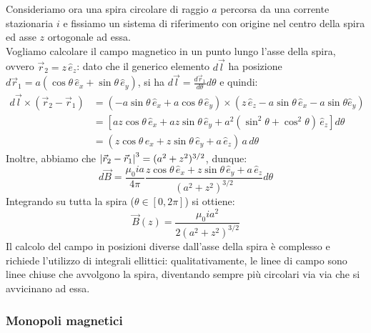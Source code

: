 \documentclass[]{article}
\begin{document}
Consideriamo ora una spira circolare di raggio $ a $ percorsa da una corrente stazionaria $ i $ e fissiamo un sistema di riferimento con origine nel centro della spira ed asse $ z $ ortogonale ad essa. \\ 
%
Vogliamo calcolare il campo magnetico in un punto lungo l'asse della spira, ovvero $ \vec{r}_2 = z \, \hat{e}_z $: dato che il generico elemento $ d\vec{l} $ ha posizione $ d\vec{r}_1 = a (\cos{\theta} \, \hat{e}_x + \sin{\theta} \, \hat{e}_y) $, si ha $ d\vec{l} = \frac{d\vec{r}_1}{d\theta}d\theta $ e quindi:
\begin{equation}
	\begin{split}
		d\vec{l} \times (\vec{r}_2 - \vec{r}_1) &= (-a \sin{\theta} \, \hat{e}_x + a \cos{\theta} \, \hat{e}_y) \times (z \, \hat{e}_z - a \sin{\theta} \, \hat{e}_x - a \sin{\theta} \hat{e}_y) \\ 
							&= \left[ az \cos{\theta} \, \hat{e}_x + az \sin{\theta} \, \hat{e}_y + a^2 (\sin^2{\theta} + \cos^2{\theta}) \, \hat{e}_z \right] d\theta \\ 
							&= (z \cos{\theta} \, \hat{e}_x + z \sin{\theta} \, \hat{e}_y + a \, \hat{e}_z) \, a \, d\theta
	\end{split}
	\label{eq:}
\end{equation}
Inoltre, abbiamo che $ \left\lvert\vec{r}_2 - \vec{r}_1\right\rvert^3 = (a^2 + z^2)^{3/2} $, dunque:
\begin{equation}
	d\vec{B} = \displaystyle\frac{\mu_0 i a}{4\pi} \displaystyle\frac{z \cos{\theta} \, \hat{e}_x + z \sin{\theta} \, \hat{e}_y + a \, \hat{e}_z}{(a^2 + z^2)^{3/2}} d\theta
	\label{eq:}
\end{equation}
Integrando su tutta la spira ($ \theta \in [0, 2\pi] $) si ottiene:
\begin{equation}
	\vec{B}(z) = \displaystyle\frac{\mu_0 i a^2}{2(a^2 + z^2)^{3/2}}
	\label{eq:mag-spir}
\end{equation}
Il calcolo del campo in posizioni diverse dall'asse della spira è complesso e richiede l'utilizzo di integrali ellittici: qualitativamente, le linee di campo sono linee chiuse che avvolgono la spira, diventando sempre più circolari via via che si avvicinano ad essa.

\subsubsection{Monopoli magnetici}
\end{document}
